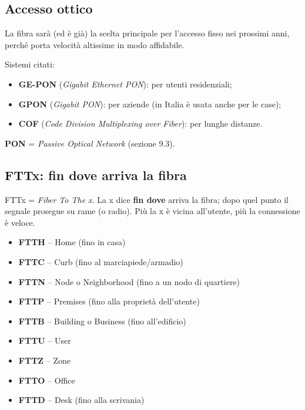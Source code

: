 \subsection{Accesso ottico}

\begin{inbreve}

La fibra sarà (ed è già) la scelta principale per l'accesso fisso nei prossimi anni, perché porta velocità altissime in modo affidabile.

\end{inbreve}

Sistemi citati:

\begin{itemize}
\tightlist
\item
  \textbf{GE-PON} (\emph{Gigabit Ethernet PON}): per utenti residenziali;
\item
  \textbf{GPON} (\emph{Gigabit PON}): per aziende (in Italia è usata anche per le case);
\item
  \textbf{COF} (\emph{Code Division Multiplexing over Fiber}): per lunghe distanze.
\end{itemize}

\textbf{PON} = \emph{Passive Optical Network} (sezione 9.3).

\subsection{FTTx: fin dove arriva la fibra}

\begin{inbreve}

FTTx = \emph{Fiber To The x}. La x dice \textbf{fin dove} arriva la fibra; dopo quel punto il segnale prosegue su rame (o radio). Più la x è vicina all'utente, più la connessione è veloce.

\end{inbreve}

\begin{itemize}
\tightlist
\item
  \textbf{FTTH} -- Home (fino in casa)
\item
  \textbf{FTTC} -- Curb (fino al marciapiede/armadio)
\item
  \textbf{FTTN} -- Node o Neighborhood (fino a un nodo di quartiere)
\item
  \textbf{FTTP} -- Premises (fino alla proprietà dell'utente)
\item
  \textbf{FTTB} -- Building o Business (fino all'edificio)
\item
  \textbf{FTTU} -- User
\item
  \textbf{FTTZ} -- Zone
\item
  \textbf{FTTO} -- Office
\item
  \textbf{FTTD} -- Desk (fino alla scrivania)
\end{itemize}

